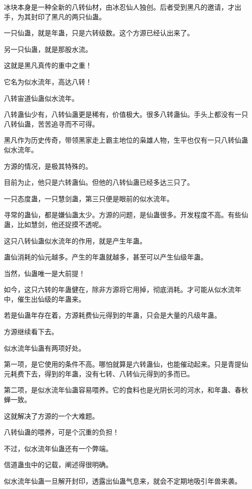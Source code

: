 \begin{this_body}
冰块本身是一种全新的八转仙材，由冰忍仙人独创。后者受到黑凡的邀请，才出手，为其封印了黑凡的两只仙蛊。

一只仙蛊，就是年蛊，只是六转级数。这个方源已经认出来了。

另一只仙蛊，就是那股水流。

这就是黑凡真传的重中之重！

它名为似水流年，高达八转！

八转宙道仙蛊似水流年。

八转蛊仙少有，八转仙蛊更是稀有，价值极大。很多八转蛊仙。手头上都没有一只八转仙蛊，苦苦追寻而不可得。

黑凡作为历史传奇，带领黑家走上霸主地位的枭雄人物，生平也仅有一只八转仙蛊似水流年。

方源的情况，是极其特殊的。

目前为止，他只是六转蛊仙。但他的八转仙蛊已经多达三只了。

一只态度蛊，一只慧剑蛊，第三只便是眼前的似水流年。

寻常的蛊仙，都是嫌仙蛊太少。方源的问题，是仙蛊很多。开发程度不高。有些仙蛊，比如慧剑，他还捉摸不透呢。

这只八转仙蛊似水流年的作用，就是产生年蛊。

蛊仙消耗的仙元越多。产生的年蛊就越多，甚至可以产生仙级年蛊。

当然，仙蛊唯一是大前提！

如今，这只六转的年蛊健在，除非方源将它用掉，彻底消耗。才可能从似水流年中，催生出仙级的年蛊来。

若是仙蛊年存在着，方源耗费仙元得到的年蛊，只会是大量的凡级年蛊。

方源继续看下去。

似水流年仙蛊有两项好处。

第一项，是它使用的条件不高。哪怕就算是六转蛊仙，也能催动起来。只是青提仙元耗费下去，得到的年蛊，没有七转、八转仙元得到的多而已。

第二项，是似水流年仙蛊容易喂养。它的食料也是光阴长河的河水，和年蛊、春秋蝉一致。

这就解决了方源的一个大难题。

八转仙蛊的喂养，可是个沉重的负担！

不过，似水流年仙蛊还有一个弊端。

信道蛊虫中的记载，阐述得很明确。

似水流年仙蛊一旦解开封印，透露出仙蛊气息来，就会不定期地吸引年兽来袭。


\end{this_body}
